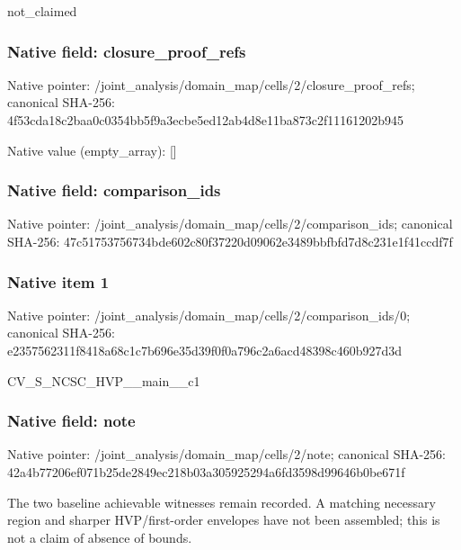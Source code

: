\documentclass[10pt,a4paper]{article}
\begin{document}
\begingroup\raggedright\sloppy not\_\allowbreak{}claimed\par\endgroup

\subsubsection{Native field: closure\_\allowbreak{}proof\_\allowbreak{}refs}
Native pointer: /joint\_\allowbreak{}analysis/domain\_\allowbreak{}map/cells/2/closure\_\allowbreak{}proof\_\allowbreak{}refs; canonical SHA-256: 4f53cda18c2baa0c0354bb5f9a3ecbe5ed12ab4d8e11ba873c2f11161202b945

Native value (empty\_\allowbreak{}array): []

\subsubsection{Native field: comparison\_\allowbreak{}ids}
Native pointer: /joint\_\allowbreak{}analysis/domain\_\allowbreak{}map/cells/2/comparison\_\allowbreak{}ids; canonical SHA-256: 47c51753756734bde602c80f37220d09062e3489bbfbfd7d8c231e1f41ccdf7f

\subsubsection{Native item 1}
Native pointer: /joint\_\allowbreak{}analysis/domain\_\allowbreak{}map/cells/2/comparison\_\allowbreak{}ids/0; canonical SHA-256: e2357562311f8418a68c1c7b696e35d39f0f0a796c2a6acd48398c460b927d3d

\begingroup\raggedright\sloppy CV\_\allowbreak{}S\_\allowbreak{}NCSC\_\allowbreak{}HVP\_\allowbreak{}\_\allowbreak{}main\_\allowbreak{}\_\allowbreak{}c1\par\endgroup

\subsubsection{Native field: note}
Native pointer: /joint\_\allowbreak{}analysis/domain\_\allowbreak{}map/cells/2/note; canonical SHA-256: 42a4b77206ef071b25de2849ec218b03a305925294a6fd3598d99646b0be671f

\begingroup\raggedright\sloppy The two baseline achievable witnesses remain recorded. A matching necessary region and sharper HVP/\allowbreak{}first-order envelopes have not been assembled;\allowbreak{} this is not a claim of absence of bounds.\par\endgroup
\end{document}
